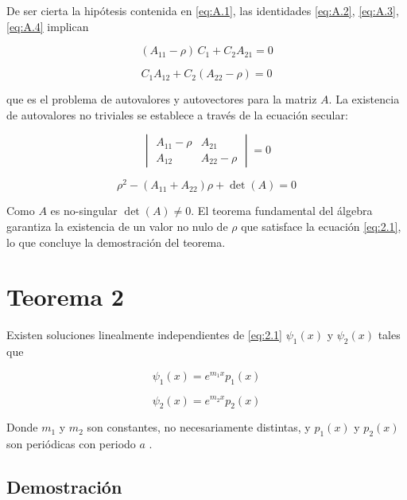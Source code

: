  De ser cierta la hipótesis contenida en \ref{eq:A.1}, las identidades \ref{eq:A.2}, \ref{eq:A.3}, \ref{eq:A.4} implican

\begin{equation}\label{eq:A.5}
    (A_{11}-\rho)\,C_1+C_2A_{21}=0
\end{equation}

\begin{equation}\label{eq:A.6}
    C_1A_{12}+C_2(A_{22}-\rho)=0
\end{equation}

que es el problema de autovalores y autovectores para la matriz $A$. La existencia de autovalores no triviales se establece a través de la ecuación secular: 

\begin{equation}\label{eq:A.7}
    \begin{vmatrix}
    A_{11}-\rho & A_{21}\\
    A_{12} & A_{22}-\rho
    \end{vmatrix}=0
\end{equation}

\begin{equation}\label{eq:A.8}
    \rho^2-(A_{11}+A_{22})\rho+\det(A)=0
\end{equation}

Como $A$ es no-singular $\det(A) \neq 0$. El teorema fundamental del álgebra garantiza la existencia de un valor no nulo de $\rho$ que satisface la ecuación \ref{eq:2.1}, lo que concluye la demostración del teorema.

\section{Teorema 2}

Existen soluciones linealmente independientes de \ref{eq:2.1} $\psi_1(x)$ y $\psi_2(x)$ tales que

\begin{equation}\label{eq:A.9}
    \psi_1(x)=e^{m_1x}p_1(x)
\end{equation}

\begin{equation}\label{eq:A.10}
    \psi_2(x)=e^{m_2x}p_2(x)
\end{equation}

Donde $m_1$ y $m_2$ son constantes, no necesariamente distintas, y $p_1(x)$ y $p_2(x)$ son periódicas con periodo $a$ \cite{floquet}.

\subsection*{Demostración}

